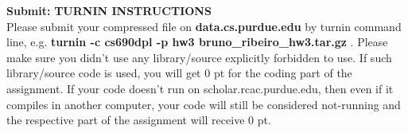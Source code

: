 \documentclass{article}
\newcommand{\homeworknumber}{3\xspace}
\begin{document}
%
\hfill

%
\noindent \textbf{Submit:}
%
{\bf TURNIN INSTRUCTIONS}
\\
%
Please submit your compressed file on \textbf{data.cs.purdue.edu} by turnin
command line, e.g. \textbf{
    turnin -c cs690dpl -p hw\homeworknumber
    bruno\_ribeiro\_hw\homeworknumber.tar.gz
}.
%
Please make sure you didn't use any library/source explicitly forbidden to use.
%
If such library/source code is used, you will get 0 pt for the coding part of
the assignment.
%
If your code doesn't run on scholar.rcac.purdue.edu, then even if it compiles
in another computer, your code will still be considered not-running and the
respective part of the assignment will receive 0 pt.




%
\end{document}
